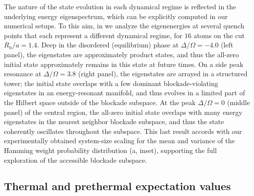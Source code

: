 \documentclass[english,floatfix,twocolumn,showpacs, aps, prx, reprint, superscriptaddress, longbibliography]{revtex4-2}
\begin{document}
The nature of the state evolution in each dynamical regime is reflected in the underlying energy eigenspectrum, which can be explicitly computed in our numerical setups. To this aim, in  we analyze the eigenenergies at several quench points that each represent a different dynamical regime, for $16$ atoms on the cut $R_\mathrm{b} / a = 1.4$. Deep in the disordered (equilibrium) phase at $\Delta/\Omega = -4.0$ (left panel), the eigenstates are approximately product states, and thus the all-zero initial state approximately remains in this state at future times. On a side peak resonance at $\Delta/\Omega = 3.8$ (right panel), the eigenstates are arrayed in a structured tower; the initial state overlaps with a few dominant blockade-violating eigenstates in an energy-resonant manifold, and thus evolves in a limited part of the Hilbert space outside of the blockade subspace. At the peak $\Delta / \Omega = 0$ (middle panel) of the central region, the all-zero initial state overlaps with many energy eigenstates in the nearest neighbor blockade subspace, and thus the state coherently oscillates throughout the subspace. This last result accords with our experimentally obtained system-size scaling for the mean and variance of the Hamming weight probability distribution (a, inset), supporting the full exploration of the accessible blockade subspace.

\subsection{Thermal and prethermal expectation values}
\label{supp:sec:DPTs_1D_thermal}
\end{document}
